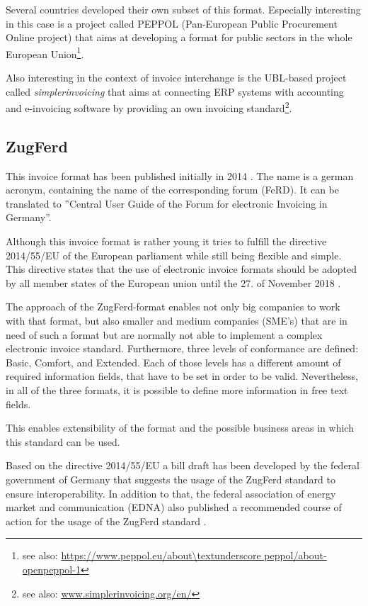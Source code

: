 Several countries developed their own subset of this format. Especially interesting in this case is a project called PEPPOL (Pan-European Public Procurement Online project) that aims at developing a format for public sectors in the whole European Union\footnote {see also: \url{https://www.peppol.eu/about\textunderscore peppol/about-openpeppol-1}}. 

Also interesting in the context of invoice interchange is the UBL-based project called \emph{simplerinvoicing} that aims at connecting ERP systems with accounting and e-invoicing software by providing an own invoicing standard\footnote {see also: \url{www.simplerinvoicing.org/en/}}. 

\subsection{ZugFerd}
\label{sec2.1.4}

This invoice format has been published initially in 2014 \cite{Ferd14}. The name is a german acronym, containing the name of the corresponding forum (FeRD). It can be translated to ''Central User Guide of the Forum for electronic Invoicing in Germany''. 

Although this invoice format is rather young it tries to fulfill the directive 2014/55/EU of the European parliament \cite{eu14} while still being flexible and simple. This directive states that the use of electronic invoice formats should be adopted by all member states of the European union until the 27. of November 2018 \cite[article 11]{eu14}. 
 
The approach of the ZugFerd-format enables not only big companies to work with that format, but also smaller and medium companies (SME's) that are in need of such a format but are normally not able to implement a complex electronic invoice standard. 
Furthermore, three levels of conformance are defined: Basic, Comfort, and Extended. Each of those levels has a different amount of required information fields, that have to be set in order to be valid. Nevertheless, in all of the three formats, it is possible to define more information in free text fields. 

This enables extensibility of the format and the possible business areas in which this standard can be used.

Based on the directive 2014/55/EU \cite{eu14} a bill draft has been developed by the federal government of Germany \cite[page 10]{br16} that suggests the usage of the ZugFerd standard to ensure interoperability. In addition to that, the federal association of energy market and communication (EDNA) also published a recommended course of action for the usage of the ZugFerd standard \cite{edna16}.

